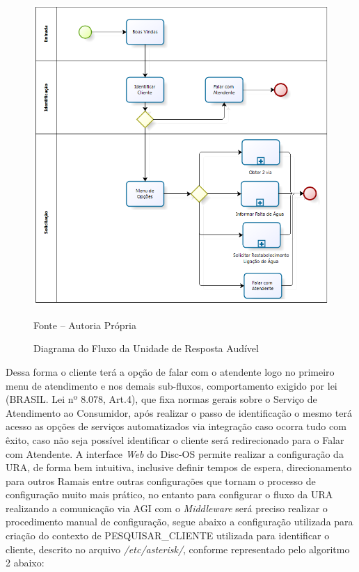 \begin{figure}[!htb]
	\centering
	\includegraphics{figuras/fluxo_ura.png}
	\caption{Diagrama do Fluxo da Unidade de Resposta Audível}
	\label{figura:fluxoURA}	
	Fonte – Autoria Própria
\end{figure}


Dessa forma o cliente terá a opção de falar com o atendente logo no primeiro menu de atendimento e nos demais sub-fluxos, comportamento exigido por lei (BRASIL. Lei nº 8.078, Art.4), que fixa normas gerais sobre o Serviço de Atendimento ao Consumidor, após realizar o passo de identificação o mesmo terá acesso as opções de serviços automatizados via integração caso ocorra tudo com êxito, caso não seja possível identificar o cliente será redirecionado para o Falar com Atendente.
A interface \textit{Web} do Disc-OS permite realizar a configuração da URA, de forma bem intuitiva, inclusive definir tempos de espera, direcionamento para outros Ramais entre outras configurações que tornam o processo de configuração muito mais prático, no entanto para configurar o fluxo da URA realizando a comunicação via AGI com o \textit{Middleware} será preciso realizar o procedimento manual de configuração, segue abaixo a configuração utilizada para criação do contexto de PESQUISAR\_CLIENTE utilizada para identificar o cliente, descrito no arquivo \textit{/etc/asterisk/}, conforme representado pelo algoritmo 2 abaixo:


